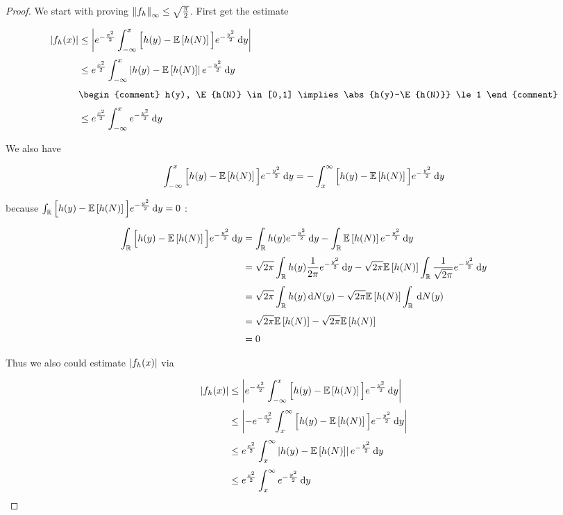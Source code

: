 \begin{proof}
  We start with proving $\left\|{f_h}\right\|_\infty\le \sqrt{\frac{\pi}{2}}$. First get the estimate

  \begin{align} \label{eq:estimate1}
    \abs{f_h(x)} & \le \abs{\e{-\frac{x^2}{2}} \int_{-\infty}^x \Big[ h(y) - \E{h(N)} \Big] \e{-\frac{y^2}{2}} \d{y} } \nl 
    &\le \e{\frac{x^2}{2}} \int_{-\infty}^x \abs{h(y)-\E{h(N)}} \e{-\frac{y^2}{2}}\d{y} \nl
    &
    \begin{comment}
      h(y), \E{h(N)} \in [0,1] \implies \abs{h(y)-\E{h(N)}} \le 1
    \end{comment} \nl
    & \le \e{\frac{x^2}{2}} \int_{-\infty}^x \e{-\frac{y^2}{2}} \d{y}
  \end{align}
  
  \noindent We also have

  \begin{align}
    \int_{-\infty}^x \Big[h(y)-\mathbb E\left[{h(N)}\right]\Big] e^{-\frac{y^2}{2}} \,\mathrm d{y} = -\int_{x}^\infty \Big[h(y)-\mathbb E\left[{h(N)}\right]\Big] e^{-\frac{y^2}{2}} \,\mathrm d{y}
  \end{align}

  \noindent because $\int_{\mathbb R} \Big[h(y)-\mathbb E\left[{h(N)}\right]\Big] e^{-\frac{y^2}{2}} \,\mathrm d{y}=0$ :

  \begin{align} \label{eq:estimate2}
    \int_{\R} \Big[ h(y)-\E{h(N)} \Big] \e{-\frac{y^2}{2}} \d{y} & = \int_{\R} h(y) \e{-\frac{y^2}{2}} \d{y} - \int_{\R} \E{h(N)} \e{-\frac{y^2}2} \d{y} \nl
    &= \sqrt{2\pi} \int_{\R} h(y) \frac{1}{2\pi} \e{-\frac{y^2}{2}} \d{y} - \sqrt{2\pi} \E{h(N)} \int_{\R} \frac{1}{\sqrt{2\pi}} \e{-\frac{y^2}{2}} \d{y} \nl
    &= \sqrt{2\pi} \int_{\R} h(y) \d{N(y)} - \sqrt{2\pi} \E{h(N)} \int_{\R} \d{N(y)} \nl
    &= \sqrt{2\pi}\E{h(N)} - \sqrt{2\pi}\E{h(N)} \nl
    &= 0
  \end{align}

  \noindent Thus we also could estimate $\left|{f_h(x)}\right|$ via

  \begin{align}
    \abs{f_h(x)} & \le \abs{\e{-\frac{x^2}{2}} \int_{-\infty}^x \Big[ h(y) - \E{h(N)} \Big] \e{-\frac{y^2}{2}} \d{y} } \nl 
    & \le \abs{-\e{-\frac{x^2}{2}} \int_{x}^\infty \Big[ h(y) - \E{h(N)} \Big] \e{-\frac{y^2}{2}} \d{y} } \nl 
    &\le \e{\frac{x^2}{2}} \int_{x}^\infty \abs{h(y)-\E{h(N)}} \e{-\frac{y^2}{2}}\d{y} \nl
    &\le \e{\frac{x^2}{2}} \int_{x}^\infty \e{-\frac{y^2}{2}} \d{y}
  \end{align}
 

\end{proof}
